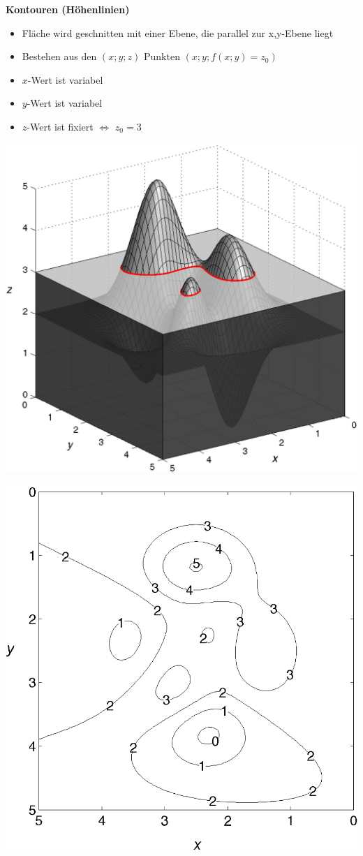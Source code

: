 
    \textbf{Kontouren (Höhenlinien)}
    \begin{itemize}
        \item Fläche wird geschnitten mit einer Ebene, die parallel zur x,y-Ebene liegt
        \item Bestehen aus den $(x;y;z)$ Punkten $(x ; y; f(x;y) = z_0)$
        \item $x$-Wert ist variabel
        \item $y$-Wert ist variabel
        \item ${z}$-Wert ist fixiert $\Leftrightarrow$ $z_0 = 3$
    \end{itemize} 

\begin{minipage}[t]{0.48\columnwidth}
    \includegraphics[width=\columnwidth]{images/niveaulinien1.png}
\end{minipage}
\hfill
\begin{minipage}[t]{0.48\columnwidth}
    \includegraphics[width=\columnwidth]{images/niveaulinien2.png}
\end{minipage}